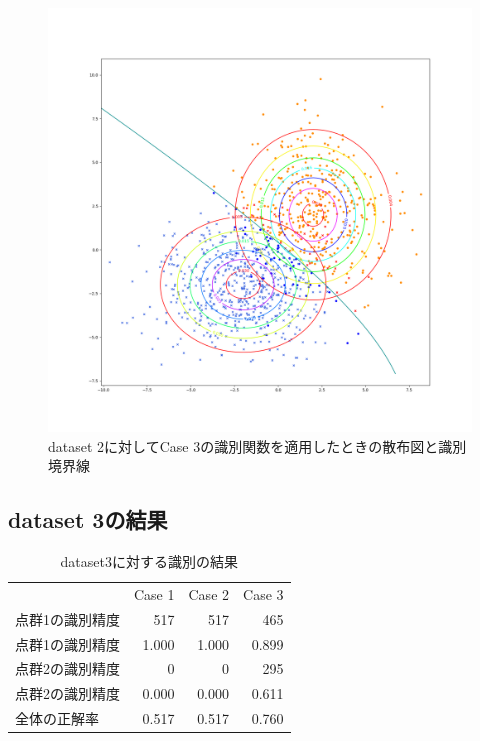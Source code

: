 \documentclass[class=jsarticle, crop=false, dvipdfmx, fleqn]{standalone}
\begin{document}
\begin{figure}
    \centering
    \includegraphics[clip, width=\linewidth]{../figures/result_assignment1_dataset2_case3.png}
    \caption{dataset 2に対してCase 3の識別関数を適用したときの散布図と識別境界線}
    \label{fig:result_dataset2_case3}
\end{figure}



\clearpage
\subsection*{dataset 3の結果}

\begin{table}[H]
    \centering
    \caption{dataset3に対する識別の結果}
    \begin{tabular}{lrrr}
            & Case 1 & Case 2 & Case 3 \\
        点群1の識別精度 & 517 & 517 & 465 \\
        点群1の識別精度 & 1.000 & 1.000 & 0.899 \\
        点群2の識別精度 & 0 & 0 & 295 \\
        点群2の識別精度 & 0.000 & 0.000 & 0.611 \\
        全体の正解率 & 0.517 & 0.517 & 0.760
    \end{tabular}
    \label{tab:dataset2_result}
\end{table}
\end{document}
